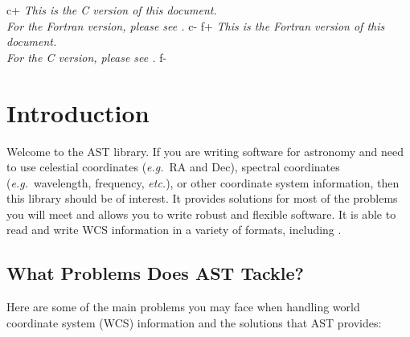 \documentclass[twoside,11pt]{starlink}
\begin{document}
\scfrontmatter

\begin{center}
c+
\emph{This is the C version of this document.\\
  For the Fortran version, please see .}
c-
f+
\emph{This is the Fortran version of this document.\\
        For the C version, please see .}
f-
\end{center}

\vspace{7mm}
\section{Introduction}

Welcome to the AST library. If you are writing software for astronomy
and need to use celestial coordinates (\emph{e.g.}\ RA and Dec), spectral
coordinates (\emph{e.g.}\ wavelength, frequency, \emph{etc.}), or
other coordinate system information, then this library should be of
interest. It provides solutions for most of the problems you will meet
and allows you to write robust and flexible software. It is able to read
and write WCS information in a variety of formats, including
.


\subsection{What Problems Does AST Tackle?}

Here are some of the main problems you may face when handling world
coordinate system (WCS) information and the solutions that AST
provides:
\end{document}
